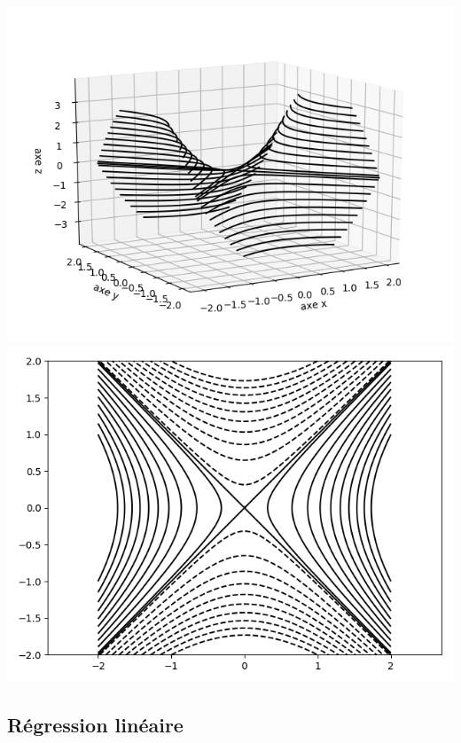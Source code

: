 \documentclass[11pt,class=report,crop=false]{standalone}
\begin{document}
\begin{exemple}
\begin{center}
\includegraphics[scale=\myscale,scale=0.5]{figures/fonctions-quadra-3d}
\includegraphics[scale=\myscale,scale=0.5]{figures/fonctions-quadra-3e}
\end{center}

\end{exemple}


\subsection{Régression linéaire}

\end{document}
